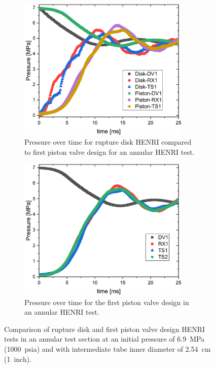 \begin{figure}[bt]
    \vspace{16pt}
    \centering
    \begin{subfigure}[t]{0.45\textwidth}
        \centering
        \includegraphics[width=0.9\textwidth]{results/plots/1000psi_ann_BD_Pis_over.png}
        \caption{Pressure over time for rupture disk HENRI compared to first piston valve design for an annular HENRI test.}
        \label{fig:mtm disk}
    \end{subfigure}
    \hfill
    \begin{subfigure}[t]{0.45\textwidth}
        \centering
        \includegraphics[width=0.9\textwidth]{results/plots/1000psi_MtMseal_25.png}
        \caption{Pressure over time for the first piston valve design in an annular HENRI test.}
        \label{fig:piston metal 1000psi}
    \end{subfigure}
    
    \caption{Comparison of rupture disk and first piston valve design HENRI tests in an annular test section at an initial pressure of \SI{6.9}{\mega\pascal} (\SI{1000}{psia}) and with intermediate tube inner diameter of \SI{2.54}{\centi\meter} (\SI{1}{inch}).}
    \label{fig:piston v disk}
    \vspace{16pt}
\end{figure}



